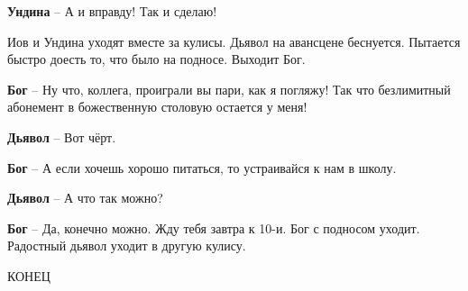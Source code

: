 \documentclass[10pt,a4paper]{article}
\begin{document}
\textbf{Ундина} -- А и вправду! Так и сделаю! 

Иов и Ундина уходят вместе за кулисы. Дьявол на авансцене беснуется. Пытается быстро доесть то, что было на подносе. Выходит Бог.

\textbf{Бог} -- Ну что, коллега, проиграли вы пари, как я погляжу! Так что безлимитный абонемент в божественную столовую остается у меня!

\textbf{Дьявол} -- Вот чёрт.

\textbf{Бог} -- А если хочешь хорошо питаться, то устраивайся к нам в школу. 

\textbf{Дьявол} -- А что так можно?

\textbf{Бог} -- Да, конечно можно. Жду тебя завтра к 10-и.
\newline
Бог с подносом уходит. Радостный дьявол уходит в другую кулису.

КОНЕЦ
 
\end{document}
